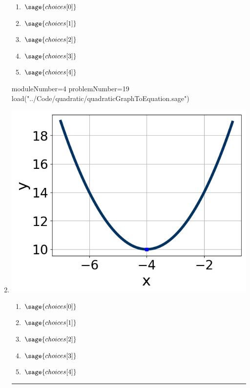 \documentclass[14pt]{article}
\newcommand{\litem}[1]{\item#1\hspace*{-1cm}\rule{\textwidth}{0.4pt}}
\begin{document}
\begin{enumerate}
{	\begin{enumerate}[label=\Alph*.]
    \item \( \sage{choices[0]} \)
    \item \( \sage{choices[1]} \)
    \item \( \sage{choices[2]} \)
    \item \( \sage{choices[3]} \)
    \item \( \sage{choices[4]} \)
	\end{enumerate}
}

\begin{sagesilent}
moduleNumber=4
problemNumber=19
load("../Code/quadratic/quadraticGraphToEquation.sage")
\end{sagesilent}

\litem{ 

	\begin{center} \includegraphics[scale=0.3]{../Figures/quadraticGraphToEquationC.png} \end{center}

	\begin{enumerate}[label=\Alph*.]
		\item \( \sage{choices[0]} \)
		\item \( \sage{choices[1]} \)
		\item \( \sage{choices[2]} \)
		\item \( \sage{choices[3]} \)
		\item \( \sage{choices[4]} \)
	\end{enumerate}

}
\end{enumerate}
\end{document}
